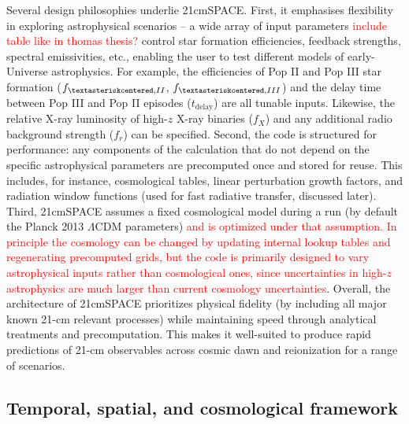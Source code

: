 \documentclass[floats,floatfix,showpacs,amssymb,prd,superscriptaddress,nofootinbib]{revtex4-2} %
\newcommand{\red}{\textcolor{red}}
\begin{document}
Several design philosophies underlie 21cmSPACE. First, it emphasises flexibility in exploring astrophysical scenarios -- a wide array of input parameters \red{include table like in thomas thesis?} control star formation efficiencies, feedback strengths, spectral emissivities, etc., enabling the user to test different models of early-Universe astrophysics. For example, the efficiencies of Pop II  and Pop III star formation ($f_{\textasteriskcentered,II}$, $f_{\textasteriskcentered,III}$) and the delay time between Pop III and Pop II episodes ($t_{\text{delay}}$) are all tunable inputs. Likewise, the relative X-ray luminosity of high-$z$ X-ray binaries ($f_X$) and any additional radio background strength ($f_r$) can be specified. Second, the code is structured for performance: any components of the calculation that do not depend on the specific astrophysical parameters are precomputed once and stored for reuse. This includes, for instance, cosmological tables, linear perturbation growth factors, and radiation window functions (used for fast radiative transfer, discussed later). Third, 21cmSPACE assumes a fixed cosmological model during a run (by default the Planck 2013 $\Lambda$CDM parameters) \red{and is optimized under that assumption. In principle the cosmology can be changed by updating internal lookup tables and regenerating precomputed grids, but the code is primarily designed to vary astrophysical inputs rather than cosmological ones, since uncertainties in high-$z$ astrophysics are much larger than current cosmology uncertainties}. Overall, the architecture of 21cmSPACE prioritizes physical fidelity (by including all major known 21-cm relevant processes) while maintaining speed through analytical treatments and precomputation. This makes it well-suited to produce rapid predictions of 21-cm observables across cosmic dawn and reionization for a range of scenarios.

\subsection{Temporal, spatial, and cosmological framework}
\end{document}
